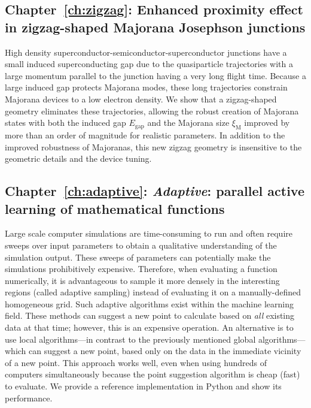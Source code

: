 \subsection{Chapter~\ref{ch:zigzag}: Enhanced proximity effect in zigzag-shaped Majorana Josephson junctions}
High density superconductor-semiconductor-superconductor junctions have a small induced superconducting gap due to the quasiparticle trajectories with a large momentum parallel to the junction having a very long flight time.
Because a large induced gap protects Majorana modes, these long trajectories constrain Majorana devices to a low electron density.
We show that a zigzag-shaped geometry eliminates these trajectories, allowing the robust creation of Majorana states with both the induced gap $E_\textrm{gap}$ and the Majorana size $\xi_\textrm{M}$ improved by more than an order of magnitude for realistic parameters.
In addition to the improved robustness of Majoranas, this new zigzag geometry is insensitive to the geometric details and the device tuning.
\vspace{1mm}

\subsection{Chapter~\ref{ch:adaptive}: \emph{Adaptive}: parallel active learning of mathematical functions}
Large scale computer simulations are time-consuming to run and often require sweeps over input parameters to obtain a qualitative understanding of the simulation output.
These sweeps of parameters can potentially make the simulations prohibitively expensive.
Therefore, when evaluating a function numerically, it is advantageous to sample it more densely in the interesting regions (called adaptive sampling) instead of evaluating it on a manually-defined homogeneous grid.
Such adaptive algorithms exist within the machine learning field.
These methods can suggest a new point to calculate based on \emph{all} existing data at that time; however, this is an expensive operation.
An alternative is to use local algorithms---in contrast to the previously mentioned global algorithms---which can suggest a new point, based only on the data in the immediate vicinity of a new point.
This approach works well, even when using hundreds of computers simultaneously because the point suggestion algorithm is cheap (fast) to evaluate.
We provide a reference implementation in Python and show its performance.
\vspace{1mm}

